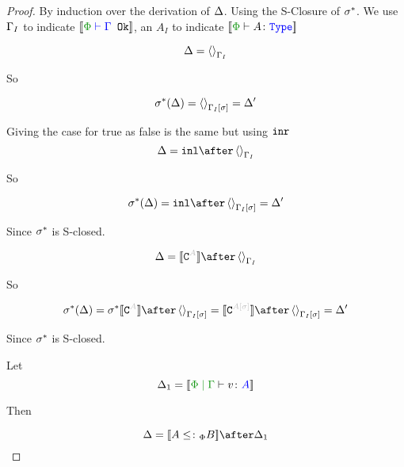 \documentclass{report}
\begin{document}
\begin{framed}
    \begin{proof}
        
    By induction over the derivation of $\Delta$. Using the S-Closure of $\sigma^*$. We use $\Gamma_I$ to indicate $\deno{\wellformedok{\P}{\G}}$, an $A_I$ to indicate $\deno{\typerelation{\P}{A}{\type}}$
    
    
    \begin{equation}
        \Delta = \left\langle\right\rangle_{\Gamma_I}
    \end{equation}
    
    So
    
    \begin{equation}
        \sigma^*(\Delta) = \left\langle\right\rangle_{\Gamma_I\left[\sigma\right]} = \Delta'
    \end{equation}
    
    Giving the case for true as false is the same but using $\texttt{inr}$
    \begin{equation}
        \D = \inl\after\term{\G_I}
    \end{equation}
    
    So
    
    \begin{equation}
        \si\star(\D) = \inl\after \term{\G_I\ssi} = \D'
    \end{equation}
    
    Since $\sigma^*$ is S-closed.
    
    
    
    \begin{equation}
        \D = \deno{\const{A}}\after\term{\G_I}
    \end{equation}
    
    So
    
    \begin{equation}
        \si\star(\D) = \si\star\deno{\const{A}}\after \term{\G_I\ssi}=\deno{\const{A\ssi}}\after \term{\G_I\ssi}  = \D'
    \end{equation}
    
    Since $\sigma^*$ is S-closed.
    
    
    Let \begin{equation}
        \D_1 = \deno{\gpetyperelation{v}{A}}
    \end{equation}
    
    Then
    
    \begin{equation}
        \D = \deno{A\subtypep B}\after \D_1\\
    \end{equation}
    

\end{proof}
\end{framed}
\end{document}
